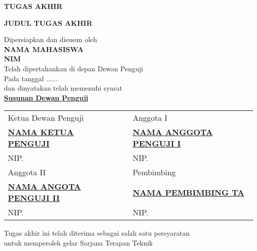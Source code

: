\begin{center}
	\begin{singlespace}
		{\normalfont\bfseries TUGAS AKHIR}\par\nobreak
		\vspace{0.5cm}
		{\normalfont\bfseries\MakeUppercase{JUDUL TUGAS AKHIR}}\par\nobreak
		\vspace{0.5cm}
		Dipersiapkan dan disusun oleh \\
		\vspace{0.5cm}
		{\normalfont\bfseries NAMA MAHASISWA}\\
		{\normalfont\bfseries NIM}\\
		\vspace{0.5cm}
		Telah dipertahankan di depan Dewan Penguji\\
		Pada tanggal $\dots\dots$\\
		dan dinyatakan telah memenuhi syarat \vspace{.5cm}\\
		
		{\underline{\bfseries{Susunan Dewan Penguji}}}\\
		\vspace{.5cm}
		
		\begin{singlespace}
			\begin{tabular}{lp{0.5cm}l}
				Ketua Dewan Penguji && Anggota I  \vspace{1.5cm}\\
				
				
				\underline{\bfseries{NAMA KETUA PENGUJI}}&& \underline{\bfseries{NAMA ANGGOTA PENGUJI I}} \\
				NIP.  && NIP. \vspace{.5cm}\\
				
				Anggota II && Pembimbing  \vspace{1.5cm}\\
				
				
				\underline{\bfseries{NAMA ANGOTA PENGUJI II}}&& \underline{\bfseries{NAMA PEMBIMBING TA}} \\
				NIP.  && NIP. 
			\end{tabular}
		\end{singlespace}
		
		
		\vspace{0.5cm}
		Tugas akhir ini telah diterima sebagai salah satu persyaratan  \\untuk memperoleh gelar Sarjana Terapan Teknik \vspace{0.3cm}\\
		

\end{singlespace}
\end{center}
